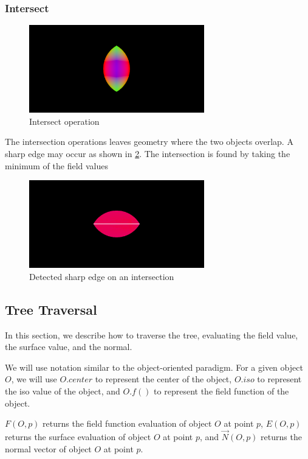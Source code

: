 \documentclass[conference]{acmsiggraph}
\begin{document}
\subsubsection{Intersect}
\begin{figure}[htbp]
	\centering
	\includegraphics[height=1.5in]{images/intersect.png}
	\caption{Intersect operation}
	\label{fig:Intersection}
\end{figure}

The intersection operations leaves geometry where the two objects overlap. A
sharp edge may occur as shown in \ref{fig:IntersectSharpEdge}. The intersection
is found by taking the minimum of the field values

\begin{figure}[htbp]
	\centering
	\includegraphics[height=1.5in]{images/intersect_sharp.png}
	\caption{Detected sharp edge on an intersection}
	\label{fig:IntersectSharpEdge}
\end{figure}



\subsection{Tree Traversal}

In this section, we describe how to traverse the tree, evaluating the field
value, the surface value, and the normal.

We will use notation similar to the object-oriented paradigm. For a given
object $O$, we will use $O.center$ to represent the center of the object,
$O.iso$ to represent the iso value of the object, and $O.f()$ to represent the
field function of the object.

$F(O, p)$ returns the
field function evaluation of object $O$ at point $p$, $E(O, p)$ returns the
surface evaluation of object $O$ at point $p$, and $\overrightarrow{N}(O, p)$
returns the normal vector of object $O$ at point $p$.
\end{document}
